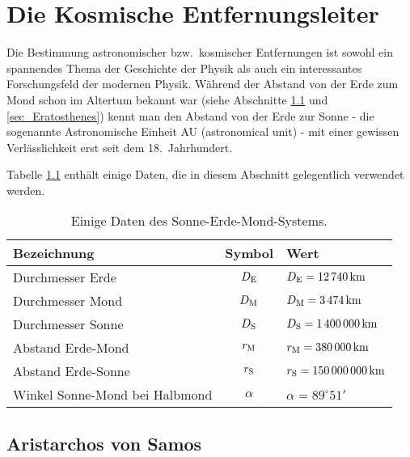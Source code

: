 

\chapter{Die Kosmische Entfernungsleiter}
\label{chap_Kosm_Entfernung}

Die Bestimmung astronomischer bzw.\ kosmischer Entfernungen ist sowohl ein
spannendes Thema der Geschichte der Physik als auch ein interessantes
Forschungsfeld der modernen Physik. W\"ahrend der Abstand von der Erde zum
Mond schon im Altertum bekannt war (siehe Abschnitte \ref{sec_Aristarchos} und \ref{sec_Eratosthenes}) 
kennt man den Abstand von der Erde zur Sonne - die sogenannte Astronomische
Einheit AU (astronomical unit) - mit einer gewissen Verl\"asslichkeit erst seit dem 18.\ Jahrhundert.

Tabelle \ref{tab_Arist} enth\"alt einige Daten, die in diesem Abschnitt gelegentlich
verwendet werden.%

\begin{table}[htb]
\begin{tabular}{l|c|l}
Bezeichnung & Symbol & Wert \\ \hline
Durchmesser Erde & $D_{\rm E}$ &  $D_{\rm E}= 12\,740\,{\rm km}$ \\
Durchmesser Mond & $D_{\rm M}$ &  $D_{\rm M}= 3\,474\,{\rm km}$ \\
Durchmesser Sonne & $D_{\rm S}$ &  $D_{\rm S}=  1\,400\,000 \,{\rm km}$ \\
Abstand Erde-Mond & $r_{\rm M}$  &  $r_{\rm M} = 380\,000\,{\rm km}$ \\
Abstand Erde-Sonne & $r_{\rm S}$  &  $r_{\rm S} = 150\,000\,000\,{\rm km}$ \\
Winkel Sonne-Mond bei Halbmond & $\alpha$ & $\alpha = 89^\circ 51'$ \\ \hline
\end{tabular}
\caption{\label{tab_Arist}%
Einige Daten des Sonne-Erde-Mond-Systems.}
\end{table}

\section{Aristarchos von Samos}
\label{sec_Aristarchos}

